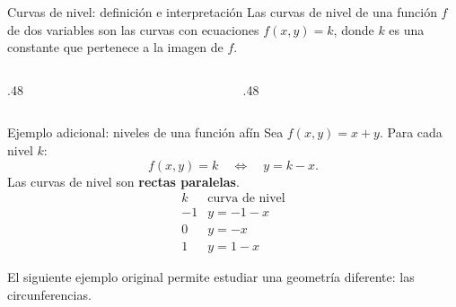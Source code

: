 \documentclass[main.tex]{subfiles}
\begin{document}
\begin{frame}{Curvas de nivel: definición e interpretación}
Las curvas de nivel de una función $f$ de dos variables son las curvas con ecuaciones $f(x,y)=k$, donde $k$ es una constante que pertenece a la imagen de $f$.
\begin{columns}[c]
\begin{column}{.48\textwidth}\end{column}
\begin{column}{.48\textwidth}\end{column}
\end{columns}
\end{frame}
\begin{frame}{Ejemplo adicional: niveles de una función afín}
Sea $f(x,y)=x+y$. Para cada nivel $k$:
\[
f(x,y)=k\quad\Longleftrightarrow\quad y=k-x.
\]
Las curvas de nivel son \textbf{rectas paralelas}.
\[
\begin{array}{c|c}
k & \text{curva de nivel}\\\hline
-1 & y=-1-x\\
0 & y=-x\\
1 & y=1-x
\end{array}
\]
\medskip

El siguiente ejemplo original permite estudiar una geometría diferente: las circunferencias.
\end{frame}
\end{document}
